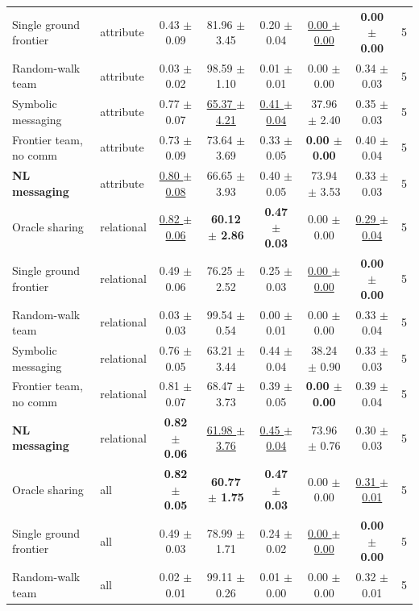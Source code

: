 \begin{tabular}{llcccccc}
Single ground frontier & attribute & 0.43 $\pm$ 0.09 & 81.96 $\pm$ 3.45 & 0.20 $\pm$ 0.04 & \underline{0.00 $\pm$ 0.00} & \textbf{0.00 $\pm$ 0.00} & 5 \\
Random-walk team & attribute & 0.03 $\pm$ 0.02 & 98.59 $\pm$ 1.10 & 0.01 $\pm$ 0.01 & 0.00 $\pm$ 0.00 & 0.34 $\pm$ 0.03 & 5 \\
Symbolic messaging & attribute & 0.77 $\pm$ 0.07 & \underline{65.37 $\pm$ 4.21} & \underline{0.41 $\pm$ 0.04} & 37.96 $\pm$ 2.40 & 0.35 $\pm$ 0.03 & 5 \\
Frontier team, no comm & attribute & 0.73 $\pm$ 0.09 & 73.64 $\pm$ 3.69 & 0.33 $\pm$ 0.05 & \textbf{0.00 $\pm$ 0.00} & 0.40 $\pm$ 0.04 & 5 \\
\textbf{NL messaging} & attribute & \underline{0.80 $\pm$ 0.08} & 66.65 $\pm$ 3.93 & 0.40 $\pm$ 0.05 & 73.94 $\pm$ 3.53 & 0.33 $\pm$ 0.03 & 5 \\
\midrule
Oracle sharing & relational & \underline{0.82 $\pm$ 0.06} & \textbf{60.12 $\pm$ 2.86} & \textbf{0.47 $\pm$ 0.03} & 0.00 $\pm$ 0.00 & \underline{0.29 $\pm$ 0.04} & 5 \\
Single ground frontier & relational & 0.49 $\pm$ 0.06 & 76.25 $\pm$ 2.52 & 0.25 $\pm$ 0.03 & \underline{0.00 $\pm$ 0.00} & \textbf{0.00 $\pm$ 0.00} & 5 \\
Random-walk team & relational & 0.03 $\pm$ 0.03 & 99.54 $\pm$ 0.54 & 0.00 $\pm$ 0.01 & 0.00 $\pm$ 0.00 & 0.33 $\pm$ 0.04 & 5 \\
Symbolic messaging & relational & 0.76 $\pm$ 0.05 & 63.21 $\pm$ 3.44 & 0.44 $\pm$ 0.04 & 38.24 $\pm$ 0.90 & 0.33 $\pm$ 0.03 & 5 \\
Frontier team, no comm & relational & 0.81 $\pm$ 0.07 & 68.47 $\pm$ 3.73 & 0.39 $\pm$ 0.05 & \textbf{0.00 $\pm$ 0.00} & 0.39 $\pm$ 0.04 & 5 \\
\textbf{NL messaging} & relational & \textbf{0.82 $\pm$ 0.06} & \underline{61.98 $\pm$ 3.76} & \underline{0.45 $\pm$ 0.04} & 73.96 $\pm$ 0.76 & 0.30 $\pm$ 0.03 & 5 \\
\midrule
Oracle sharing & all & \textbf{0.82 $\pm$ 0.05} & \textbf{60.77 $\pm$ 1.75} & \textbf{0.47 $\pm$ 0.03} & 0.00 $\pm$ 0.00 & \underline{0.31 $\pm$ 0.01} & 5 \\
Single ground frontier & all & 0.49 $\pm$ 0.03 & 78.99 $\pm$ 1.71 & 0.24 $\pm$ 0.02 & \underline{0.00 $\pm$ 0.00} & \textbf{0.00 $\pm$ 0.00} & 5 \\
Random-walk team & all & 0.02 $\pm$ 0.01 & 99.11 $\pm$ 0.26 & 0.01 $\pm$ 0.00 & 0.00 $\pm$ 0.00 & 0.32 $\pm$ 0.01 & 5 \\

\end{tabular}
